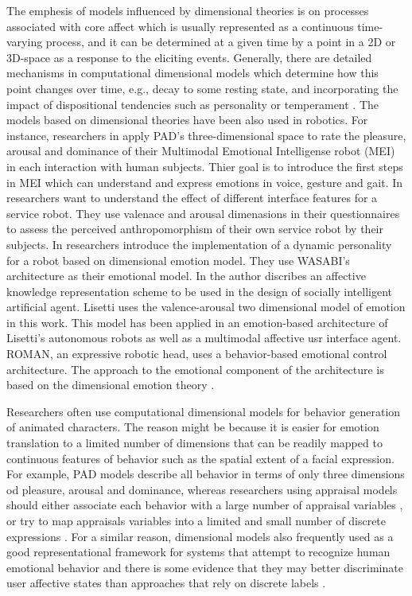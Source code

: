 \documentclass[11pt]{article}
\begin{document}
The emphesis of models influenced by dimensional theories is on processes
associated with core affect which is usually represented as a continuous
time-varying process, and it can be determined at a given time by a point in a
2D or 3D-space as a response to the eliciting events. Generally, there are
detailed mechanisms in computational dimensional models which determine how this
point changes over time, e.g., decay to some resting state, and incorporating
the impact of dispositional tendencies such as personality or temperament
\cite{gebhard:alma} \cite{marsella:computational-models}. The models based on
dimensional theories have been also used in robotics. For instance, researchers
in \cite{lim:mei-motherese-ei} apply PAD's three-dimensional space to rate the
pleasure, arousal and dominance of their Multimodal Emotional Intelligense robot
(MEI) in each interaction with human subjects. Thier goal is to introduce the
first steps in MEI which can understand and express emotions in voice, gesture
and gait. In \cite{zhang:service-robot-dimensional} researchers want to
understand the effect of different interface features for a service robot. They
use valenace and arousal dimenasions in their questionnaires to assess the
perceived anthropomorphism of their own service robot by their subjects. In
\cite{klug:emotion-based-hri} researchers introduce the implementation of a
dynamic personality for a robot based on dimensional emotion model. They use
WASABI's architecture \cite{becker:wasabi,becker:wasabi-description} as their
emotional model. In \cite{lisetti:affect-socially-intelligent} the author
discribes an affective knowledge representation scheme to be used in the design
of socially intelligent artificial agent. Lisetti uses the valence-arousal two
dimensional model of emotion in this work. This model has been applied in an
emotion-based architecture of Lisetti's autonomous robots as well as a
multimodal affective usr interface agent. ROMAN, an expressive robotic head,
uses a behavior-based emotional control architecture. The approach to the
emotional component of the architecture is based on the dimensional emotion
theory \cite{hirth:roman}.

Researchers often use computational dimensional models for behavior generation
of animated characters. The reason might be because it is easier for emotion
translation to a limited number of dimensions that can be readily mapped to
continuous features of behavior such as the spatial extent of a facial
expression. For example, PAD models describe all behavior in terms of only three
dimensions od pleasure, arousal and dominance, whereas researchers using
appraisal models should either associate each behavior with a large number of
appraisal variables \cite{scherer:expression-appraisal}
\cite{smith:computational-facial-expression}, or try to map appraisals variables
into a limited and small number of discrete expressions
\cite{elliott:affective-reasoner}. For a similar reason, dimensional models also
frequently used as a good representational framework for systems that attempt to
recognize human emotional behavior and there is some evidence that they may
better discriminate user affective states than approaches that rely on discrete
labels \cite{barrett:emotions-natural}.
\end{document}
